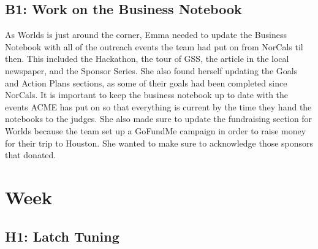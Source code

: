 \documentclass{article}
\begin{document}
\subsection{B1: Work on the Business Notebook}

As Worlds is just around the corner, Emma needed to update the Business Notebook with all of the outreach events the team had put on from NorCals til then. This included the Hackathon, the tour of GSS, the article in the local newspaper, and the Sponsor Series. She also found herself updating the Goals and Action Plans sections, as some of their goals had been completed since NorCals. It is important to keep the business notebook up to date with the events ACME has put on so that everything is current by the time they hand the notebooks to the judges. She also made sure to update the fundraising section for Worlds because the team set up a GoFundMe campaign in order to raise money for their trip to Houston. She wanted to make sure to acknowledge those sponsors that donated. 
\clearpage \newpage \section{Week \thesection} 
\subsection{H1: Latch Tuning}
\end{document}
